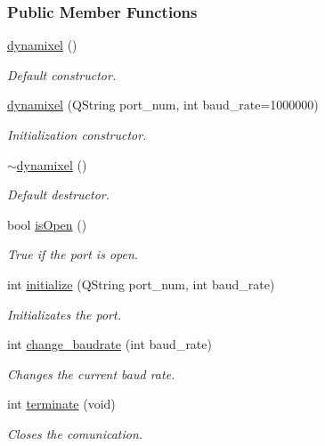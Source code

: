 \subsubsection*{Public Member Functions}
\begin{DoxyCompactItemize}
\item 
\hyperlink{a00004_a7aa668a213db6a41bede8e08a6fec830}{dynamixel} ()
\begin{DoxyCompactList}\small\item\em Default constructor. \end{DoxyCompactList}\item 
\hyperlink{a00004_a5d4fed957a4b2d1690c0fa72127f5cbf}{dynamixel} (Q\+String port\+\_\+num, int baud\+\_\+rate=1000000)
\begin{DoxyCompactList}\small\item\em Initialization constructor. \end{DoxyCompactList}\item 
\hyperlink{a00004_a58fec564d9417d2d09bc29003a9feb7a}{$\sim$dynamixel} ()
\begin{DoxyCompactList}\small\item\em Default destructor. \end{DoxyCompactList}\item 
bool \hyperlink{a00004_a5ae4b2c6eb4c91f404f973ee8e6a1914}{is\+Open} ()
\begin{DoxyCompactList}\small\item\em True if the port is open. \end{DoxyCompactList}\item 
int \hyperlink{a00004_a87960244d5846ae7583e37d2407eb61e}{initialize} (Q\+String port\+\_\+num, int baud\+\_\+rate)
\begin{DoxyCompactList}\small\item\em Initializates the port. \end{DoxyCompactList}\item 
int \hyperlink{a00004_a7554c7889896e29e11a62027d89f3fdf}{change\+\_\+baudrate} (int baud\+\_\+rate)
\begin{DoxyCompactList}\small\item\em Changes the current baud rate. \end{DoxyCompactList}\item 
int \hyperlink{a00004_a92ea074ed1c1a9cf29e039f8c425f01a}{terminate} (void)
\begin{DoxyCompactList}\small\item\em Closes the comunication. \end{DoxyCompactList}\item 

\end{DoxyCompactItemize}
